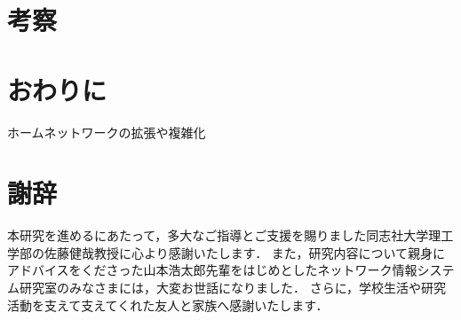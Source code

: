 \documentclass[a4paper,11pt,uplatex]{ujreport}
\begin{document}

\chapter{考察}
\label{chap:考察}

\chapter{おわりに}
\label{chap:おわりに}


  ホームネットワークの拡張や複雑化

\chapter*{謝辞}
\label{sec:Acknowledgments}


  本研究を進めるにあたって，多大なご指導とご支援を賜りました同志社大学理工学部の佐藤健哉教授に心より感謝いたします．
  また，研究内容について親身にアドバイスをくださった山本浩太郎先輩をはじめとしたネットワーク情報システム研究室のみなさまには，大変お世話になりました．
  さらに，学校生活や研究活動を支えて支えてくれた友人と家族へ感謝いたします．
\end{document}
